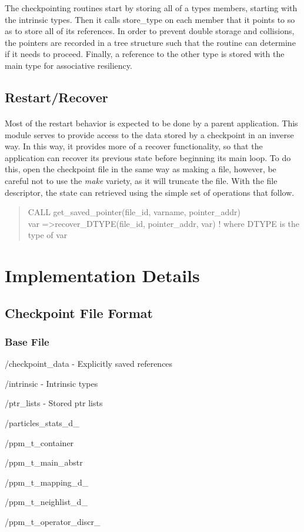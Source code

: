 \documentclass{article}
\begin{document}
The checkpointing routines start by storing all of a types members, starting with the intrinsic types. Then it calls store\_type on each member that it points to so as to store all of its references. In order to prevent double storage and collisions, the pointers are recorded in a tree structure such that the routine can determine if it needs to proceed. Finally, a reference to the other type is stored with the main type for associative resiliency.

\subsection{Restart/Recover}
\paragraph{}
Most of the restart behavior is expected to be done by a parent application. This module serves to provide access to the data stored by a checkpoint in an inverse way. In this way, it provides more of a recover functionality, so that the application can recover its previous state before beginning its main loop. To do this, open the checkpoint file in the same way as making a file, however, be careful not to use the \emph{make} variety, as it will truncate the file. With the file descriptor, the state can retrieved using the simple set of operations that follow.
\begin{quote}
   CALL get\_saved\_pointer(file\_id, varname, pointer\_addr) \\
   var =\textgreater recover\_DTYPE(file\_id, pointer\_addr, var) ! where DTYPE is the type of var
\end{quote}
\section{Implementation Details}
\subsection{Checkpoint File Format}
\subsubsection{Base File}
\begin{list}{}{}
\item /checkpoint\_data - Explicitly saved references
\item /intrinsic - Intrinsic types
\item /ptr\_lists - Stored ptr lists
\item /particles\_stats\_d\_
\item /ppm\_t\_container
\item /ppm\_t\_main\_abstr
\item /ppm\_t\_mapping\_d\_
\item /ppm\_t\_neighlist\_d\_
\item /ppm\_t\_operator\_discr\_
\end{list}
\end{document}
